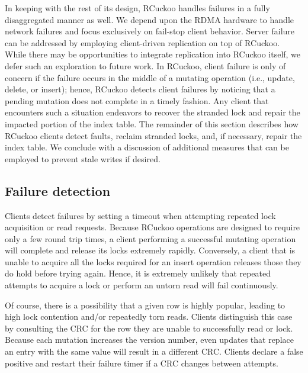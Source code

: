 In keeping with the rest of its design, RCuckoo handles failures in a
fully disaggregated manner as well.  We depend upon the RDMA hardware
to handle network failures and focus exclusively on fail-stop client
behavior.  Server failure can be addressed by employing client-driven
replication on top of RCuckoo.  While there may be opportunities to
integrate replication into RCuckoo itself, we defer such an
exploration to future work.  In RCuckoo, client failure is only of
concern if the failure occurs in the middle of a mutating operation
(i.e., update, delete, or insert); hence, RCuckoo detects client
failures by noticing that a pending mutation does not complete in a
timely fashion.  Any client that encounters such a situation endeavors
to recover the stranded lock and repair the impacted portion of the
index table.
%
%
The remainder of this section describes how RCuckoo clients detect
faults, reclaim stranded locks, and, if necessary, repair the index
table.  We conclude with a discussion of additional measures that can
be employed to prevent stale writes if desired.


\subsection{Failure detection}
\label{ss:fd}

Clients detect failures by setting a timeout when attempting repeated
lock acquisition or read requests.  Because RCuckoo operations are
designed to require only a few round trip times, a client performing a
successful mutating operation will complete and release its locks
extremely rapidly.  Conversely, a client that is unable to acquire all
the locks required for an insert operation releases those they do hold
before trying again.  Hence, it is extremely unlikely that repeated
attempts to acquire a lock or perform an untorn read will fail
continuously.

Of course, there is a possibility that a given row is highly popular,
leading to high lock contention and/or repeatedly torn reads.
Clients distinguish this case by consulting the CRC for the row they
are unable to successfully read or lock.  Because each mutation
increases the version number, even updates that replace an entry with
the same value will result in a different CRC.  Clients declare a
false positive and restart their failure timer if a CRC changes
between attempts.

